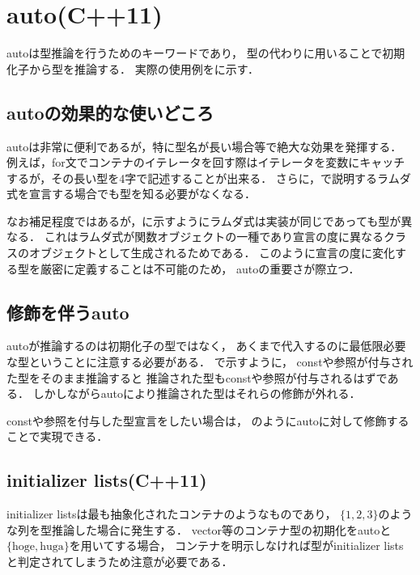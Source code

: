 \section{auto(C++11)}
autoは型推論を行うためのキーワードであり，
型の代わりに用いることで初期化子から型を推論する．
実際の使用例をに示す．


\subsection{autoの効果的な使いどころ}
autoは非常に便利であるが，特に型名が長い場合等で絶大な効果を発揮する．
例えば，for文でコンテナのイテレータを回す際はイテレータを変数にキャッチするが，その長い型を4字で記述することが出来る．
さらに，で説明するラムダ式を宣言する場合でも型を知る必要がなくなる．


なお補足程度ではあるが，に示すようにラムダ式は実装が同じであっても型が異なる．
これはラムダ式が関数オブジェクトの一種であり宣言の度に異なるクラスのオブジェクトとして生成されるためである．
このように宣言の度に変化する型を厳密に定義することは不可能のため，
autoの重要さが際立つ．


\subsection{修飾を伴うauto}
autoが推論するのは初期化子の型ではなく，
あくまで代入するのに最低限必要な型ということに注意する必要がある．
で示すように，
constや参照が付与された型をそのまま推論すると
推論された型もconstや参照が付与されるはずである．
しかしながらautoにより推論された型はそれらの修飾が外れる．

constや参照を付与した型宣言をしたい場合は，
のようにautoに対して修飾することで実現できる．



\subsection{initializer lists(C++11)}
initializer listsは最も抽象化されたコンテナのようなものであり，
$\{1,2,3\}$のような列を型推論した場合に発生する．
vector等のコンテナ型の初期化をautoと$\{\textrm{hoge},\textrm{huga}\}$を用いてする場合，
コンテナを明示しなければ型がinitializer listsと判定されてしまうため注意が必要である．


